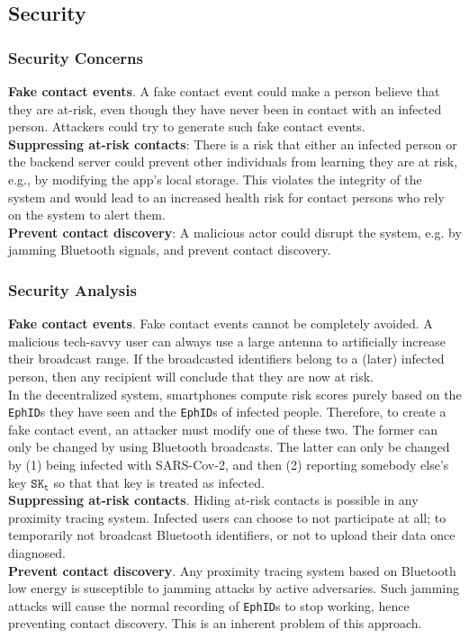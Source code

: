\documentclass[12pt,a4paper]{article}
\begin{document}
\subsection*{Security}
\subsubsection*{Security Concerns}
\textbf{Fake contact events}. A fake contact event could make a person believe that they are at-risk, even though they have never been in contact with an infected person. Attackers could try to generate such fake contact events.\\[0.3cm]
\textbf{Suppressing at-risk contacts}: There is a risk that either an infected person or the backend server could prevent other individuals from learning they are at risk, e.g., by modifying the app’s local storage. This violates the integrity of the system and would lead to an increased health risk for contact persons who rely on the system to alert them.\\[0.3cm]
\textbf{Prevent contact discovery}: A malicious actor could disrupt the system, e.g. by jamming Bluetooth signals, and prevent contact discovery.
\subsubsection*{Security Analysis}
\textbf{Fake contact events}. Fake contact events cannot be completely avoided. A malicious tech-savvy user can always use a large antenna to artificially increase their broadcast range. If the broadcasted identifiers belong to a (later) infected person, then any recipient will conclude that they are now at risk.\\[0.3cm]
In the decentralized system, smartphones compute risk scores purely based on the \texttt{EphID}s they have seen and the \texttt{EphID}s of infected people. Therefore, to create a fake contact event, an attacker must modify one of these two. The former can only be changed by using Bluetooth broadcasts. The latter can only be changed by (1) being infected with SARS-Cov-2, and then (2) reporting somebody else’s key $\texttt{SK}_\texttt{t}$ so that that key is treated as infected.\\[0.3cm]
\textbf{Suppressing at-risk contacts}. Hiding at-risk contacts is possible in any proximity tracing system. Infected users can choose to not participate at all; to temporarily not broadcast Bluetooth identifiers, or not to upload their data once diagnosed.\\[0.3cm]
\textbf{Prevent contact discovery}. Any proximity tracing system based on Bluetooth low energy is susceptible to jamming attacks by active adversaries. Such jamming attacks will cause the normal recording of \texttt{EphID}s to stop working, hence preventing contact discovery. This is an inherent problem of this approach.
\end{document}
